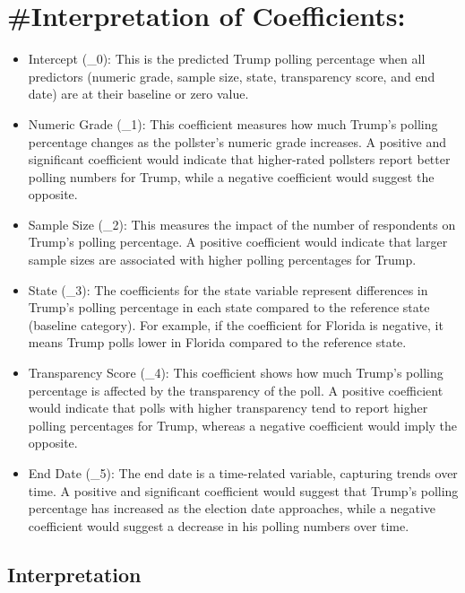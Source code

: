 \documentclass[
  letterpaper,
  DIV=11,
  numbers=noendperiod]{scrartcl}
\providecommand{\tightlist}{%
  \setlength{\itemsep}{0pt}\setlength{\parskip}{0pt}}\usepackage{longtable,booktabs,array}
\begin{document}
\section{\#Interpretation of
Coefficients:}\label{interpretation-of-coefficients}

\begin{itemize}
\tightlist
\item
  Intercept (\beta\_0): This is the predicted Trump polling percentage
  when all predictors (numeric grade, sample size, state, transparency
  score, and end date) are at their baseline or zero value.
\item
  Numeric Grade (\beta\_1): This coefficient measures how much Trump's
  polling percentage changes as the pollster's numeric grade increases.
  A positive and significant coefficient would indicate that
  higher-rated pollsters report better polling numbers for Trump, while
  a negative coefficient would suggest the opposite.
\item
  Sample Size (\beta\_2): This measures the impact of the number of
  respondents on Trump's polling percentage. A positive coefficient
  would indicate that larger sample sizes are associated with higher
  polling percentages for Trump.
\item
  State (\beta\_3): The coefficients for the state variable represent
  differences in Trump's polling percentage in each state compared to
  the reference state (baseline category). For example, if the
  coefficient for Florida is negative, it means Trump polls lower in
  Florida compared to the reference state.
\item
  Transparency Score (\beta\_4): This coefficient shows how much Trump's
  polling percentage is affected by the transparency of the poll. A
  positive coefficient would indicate that polls with higher
  transparency tend to report higher polling percentages for Trump,
  whereas a negative coefficient would imply the opposite.
\item
  End Date (\beta\_5): The end date is a time-related variable,
  capturing trends over time. A positive and significant coefficient
  would suggest that Trump's polling percentage has increased as the
  election date approaches, while a negative coefficient would suggest a
  decrease in his polling numbers over time.
\end{itemize}

\subsection{Interpretation}\label{interpretation}
\end{document}
